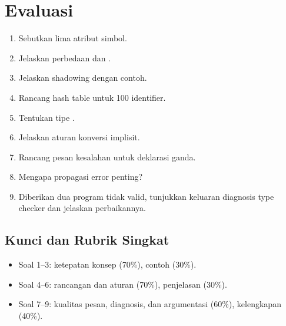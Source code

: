 \section*{Evaluasi}

\begin{enumerate}[label=\arabic*.,leftmargin=*]
  \item Sebutkan lima atribut simbol.
  \item Jelaskan perbedaan  dan
        .
  \item Jelaskan shadowing dengan contoh.
  \item Rancang hash table untuk 100 identifier.
  \item Tentukan tipe .
  \item Jelaskan aturan konversi implisit.
  \item Rancang pesan kesalahan untuk deklarasi ganda.
  \item Mengapa propagasi error penting?
  \item Diberikan dua program tidak valid, tunjukkan keluaran
        diagnosis type checker dan jelaskan perbaikannya.
\end{enumerate}

\subsection*{Kunci dan Rubrik Singkat}
\begin{itemize}[leftmargin=*]
  \item Soal 1--3: ketepatan konsep (70\%), contoh (30\%).
  \item Soal 4--6: rancangan dan aturan (70\%), penjelasan (30\%).
  \item Soal 7--9: kualitas pesan, diagnosis, dan argumentasi (60\%),
        kelengkapan (40\%).
\end{itemize}
